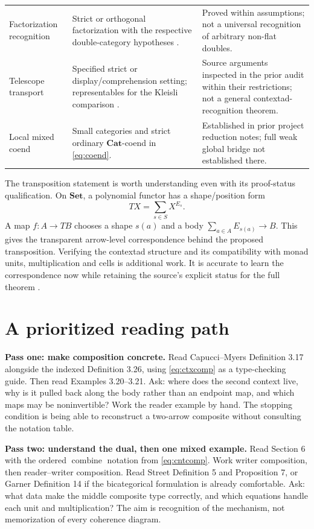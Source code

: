 \documentclass[11pt,letterpaper]{article}
\newcommand{\Cat}{\mathbf{Cat}}
\newcommand{\Set}{\mathbf{Set}}
\newcommand{\comb}{\operatorname{combine}}
\begin{document}
\begin{longtable}{@{}p{}p{}p{}@{}}
Factorization recognition & Strict or orthogonal factorization with the respective double-category hypotheses \cite{RW,Stepan}. & Proved within assumptions; not a universal recognition of arbitrary non-flat doubles. \\
Telescope transport & Specified strict or display/comprehension setting; representables for the Kleisli comparison \cite{Kamiya}. & Source arguments inspected in the prior audit within their restrictions; not a general contextad-recognition theorem. \\
Local mixed coend & Small categories and strict ordinary $\Cat$-coend in \eqref{eq:coend}. & Established in prior project reduction notes; full weak global bridge not established there. \\
\bottomrule
\end{longtable}

The transposition statement is worth understanding even with its proof-status qualification. On $\Set$, a polynomial functor has a shape/position form
\[
TX=\sum_{s\in S}X^{E_s}.
\]
A map $f:A\to TB$ chooses a shape $s(a)$ and a body $\sum_{a\in A}E_{s(a)}\to B$. This gives the transparent arrow-level correspondence behind the proposed transposition. Verifying the contextad structure and its compatibility with monad units, multiplication and cells is additional work. It is accurate to learn the correspondence now while retaining the source's explicit status for the full theorem \cite[Appendix A]{CM}.

\section{A prioritized reading path}
\label{sec:reading}
\textbf{Pass one: make composition concrete.} Read Capucci--Myers Definition 3.17 alongside the indexed Definition 3.26, using \eqref{eq:ctxcomp} as a type-checking guide. Then read Examples 3.20--3.21. Ask: where does the second context live, why is it pulled back along the body rather than an endpoint map, and which maps may be noninvertible? Work the reader example by hand. The stopping condition is being able to reconstruct a two-arrow composite without consulting the notation table.

\textbf{Pass two: understand the dual, then one mixed example.} Read Section 6 with the ordered $\comb$ notation from \eqref{eq:cntcomp}. Work writer composition, then reader--writer composition. Read Street Definition 5 and Proposition 7, or Garner Definition 14 if the bicategorical formulation is already comfortable. Ask: what data make the middle composite type correctly, and which equations handle each unit and multiplication? The aim is recognition of the mechanism, not memorization of every coherence diagram.
\end{document}
